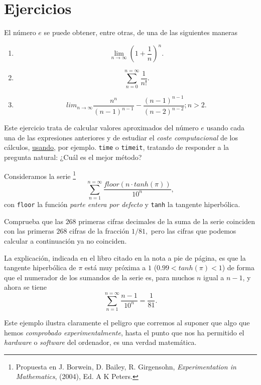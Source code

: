 \section{Ejercicios}\label{ejer-7}
\begin{ejer}
 
 El n\'umero $e$ se puede obtener, entre otras, de una de las siguientes maneras
\begin{enumerate}
\item     \[\lim_{n\to \infty}(1+\frac{1}{n})^n.\]
\item     \[\sum_{n=0}^{n=\infty}\frac{1}{n!}.\]
 \item    \[lim_{n\to \infty}
\frac{n^n}{(n-1)^{n-1}}-\frac{(n-1)^{n-1}}{(n-2)^{n-2}};
n>2.\]
\end{enumerate}
Este ejercicio trata de calcular valores aproximados del n\'umero $e$ usando
cada una de las expresiones anteriores y de estudiar el {\itshape coste
computacional} de los c\'alculos, \hyperref[time]{usando},  por ejemplo. 
\lstinline|time| o \lstinline|timeit|, tratando de responder a la pregunta
natural: ¿Cu\'al es el mejor m\'etodo?

\end{ejer}


\begin{ejer}
 
 Consideramos la serie \footnote{Propuesta en J. Borwein, D. Bailey, R.
Girgensohn, {\itshape Experimentation in Mathematics}, (2004), Ed. A K Peters.} 
 \[\sum_{n=1}^{n=\infty} \frac{floor(n\cdot tanh(\pi))}{10^n},\]
 \noindent con {\tt floor} la funci\'on {\itshape parte entera por defecto} y
{\tt tanh} la tangente hiperb\'olica.

{\sc Comprueba} que las $268$ primeras cifras decimales  de la suma de la serie
coinciden con las primeras $268$ cifras de la fracci\'on $1/81,$ pero las cifras que podemos calcular a continuaci\'on ya no coinciden.  

La explicaci\'on, indicada en el libro citado en la nota a pie de p\'agina, es que la tangente hiperb\'olica
de $\pi$ est\'a muy pr\'oxima a $1$ ($0{.}99<tanh(\pi)<1$) de forma que el
numerador de los sumandos de la serie es, para muchos $n$ igual a $n-1$, y
ahora se tiene 
\[\sum_{n=1}^{n=\infty} \frac{n-1}{10^n}=\frac{1}{81}.\]

Este ejemplo ilustra claramente el peligro que corremos al suponer que algo que
hemos {\itshape comprobado experimentalmente}, hasta el punto  que nos ha
permitido el {\itshape hardware} o {\itshape software} del ordenador, es una
verdad matem\'atica. 
 
\end{ejer}


